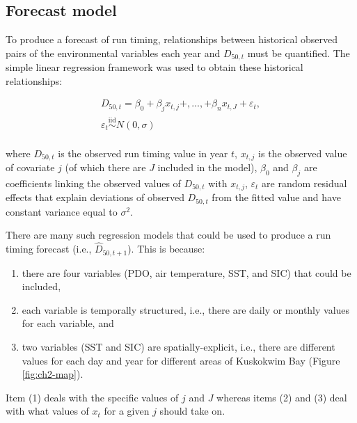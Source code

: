 \documentclass[12pt,]{book}
\providecommand{\tightlist}{%
  \setlength{\itemsep}{0pt}\setlength{\parskip}{0pt}}
\theoremstyle{definition}
\theoremstyle{definition}
\theoremstyle{definition}
\theoremstyle{remark}
\begin{document}
\subsection{Forecast model}\label{reg-models}

To produce a forecast of run timing, relationships between historical
observed pairs of the environmental variables each year and \(D_{50,t}\)
must be quantified. The simple linear regression framework was used to
obtain these historical relationships:

\begin{equation}
  \begin{split}
    D_{50,t} = \beta_0 + \beta_j x_{t,j} +,...,+ \beta_n x_{t,J} + \varepsilon_t, \\
    \varepsilon_t \stackrel{\text{iid}}{\sim} N(0, \sigma) \\
  \end{split}
\label{eq:lin-reg}
\end{equation}

\noindent
where \(D_{50,t}\) is the observed run timing value in year \(t\),
\(x_{t,j}\) is the observed value of covariate \(j\) (of which there are
\(J\) included in the model), \(\beta_0\) and \(\beta_j\) are
coefficients linking the observed values of \(D_{50,t}\) with
\(x_{t,j}\), \(\varepsilon_t\) are random residual effects that explain
deviations of observed \(D_{50,t}\) from the fitted value and have
constant variance equal to \(\sigma^2\).

There are many such regression models that could be used to produce a
run timing forecast (i.e., \(\hat{D}_{50,t+1}\)). This is because:

\begin{enumerate}
\def\labelenumi{(\arabic{enumi})}
\tightlist
\item
  there are four variables (PDO, air temperature, SST, and SIC) that
  could be included,
\item
  each variable is temporally structured, i.e., there are daily or
  monthly values for each variable, and
\item
  two variables (SST and SIC) are spatially-explicit, i.e., there are
  different values for each day and year for different areas of
  Kuskokwim Bay (Figure \ref{fig:ch2-map}).
\end{enumerate}

\noindent
Item (1) deals with the specific values of \(j\) and \(J\) whereas items
(2) and (3) deal with what values of \(x_{t}\) for a given \(j\) should
take on.
\end{document}
